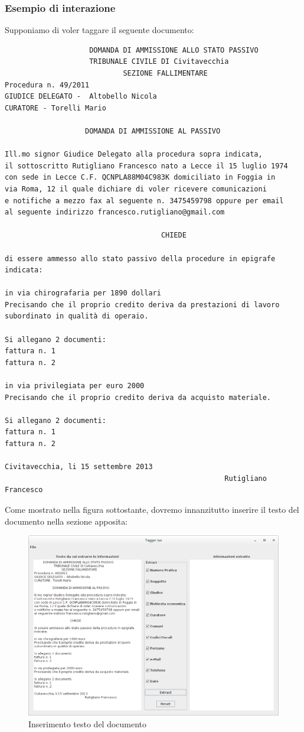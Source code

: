 	\subsubsection{Esempio di interazione}
	Supponiamo di voler taggare il seguente documento:
	\small
	\label{doc-example}
	\begin{verbatim}
	                DOMANDA DI AMMISSIONE ALLO STATO PASSIVO
                    TRIBUNALE CIVILE DI Civitavecchia
                            SEZIONE FALLIMENTARE
Procedura n. 49/2011
GIUDICE DELEGATO -  Altobello Nicola
CURATORE - Torelli Mario
                   
                   DOMANDA DI AMMISSIONE AL PASSIVO

Ill.mo signor Giudice Delegato alla procedura sopra indicata, 
il sottoscritto Rutigliano Francesco nato a Lecce il 15 luglio 1974 
con sede in Lecce C.F. QCNPLA88M04C983K domiciliato in Foggia in 
via Roma, 12 il quale dichiare di voler ricevere comunicazioni 
e notifiche a mezzo fax al seguente n. 3475459798 oppure per email 
al seguente indirizzo francesco.rutigliano@gmail.com

                                     CHIEDE

di essere ammesso allo stato passivo della procedure in epigrafe indicata:

in via chirografaria per 1890 dollari 
Precisando che il proprio credito deriva da prestazioni di lavoro 
subordinato in qualità di operaio.

Si allegano 2 documenti:
fattura n. 1
fattura n. 2

in via privilegiata per euro 2000 
Precisando che il proprio credito deriva da acquisto materiale.

Si allegano 2 documenti:
fattura n. 1
fattura n. 2

Civitavecchia, li 15 settembre 2013
                                                    Rutigliano Francesco
	\end{verbatim}

Come mostrato nella figura sottostante, dovremo innanzitutto inserire il testo del documento nella sezione apposita:
\begin{figure}[H]
	\includegraphics[width=1\textwidth]{img/interfaces/java-document.png}
	\caption[[Schermata java document]{Inserimento testo del documento}
	\label{java-doc}
\end{figure}

